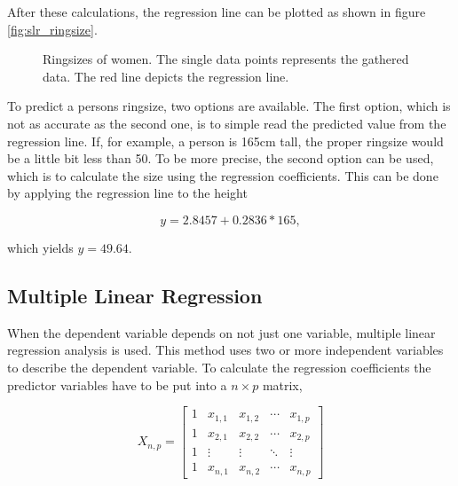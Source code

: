 After these calculations, the regression line can be plotted as shown in figure \vref{fig:slr_ringsize}.

\begin{figure}[h]
\centering
{}

\caption{Ringsizes of women. The single data points represents the gathered data. The red line depicts the regression line.}
\label{fig:slr_ringsize}
\end{figure}

To predict a persons ringsize, two options are available. The first option, which is not as accurate as the second one, is to simple read the predicted value from the regression line. If, for example, a person is 165cm tall, the proper ringsize would be a little bit less than 50. To be more precise, the second option can be used, which is to calculate the size using the regression coefficients. This can be done by applying the regression line to the height

\begin{equation}
    y = 2.8457 + 0.2836 * 165,
\end{equation}

which yields $ y = 49.64 $.

\subsection{Multiple Linear Regression}
\label{sec:mlr}

When the dependent variable depends on not just one variable, multiple linear regression analysis is used. This method uses two or more independent variables to describe the dependent variable. To calculate the regression coefficients the predictor variables have to be put into a $ n \times p $ matrix,

\begin{equation}
    X_{n,p} =
        \begin{bmatrix}
            1 & x_{1,1} & x_{1,2} & \cdots & x_{1,p} \\
            1 & x_{2,1} & x_{2,2} & \cdots & x_{2,p} \\
            1 & \vdots & \vdots & \ddots & \vdots \\
            1 & x_{n,1} & x_{n,2} & \cdots & x_{n,p}
        \end{bmatrix}
\end{equation}

